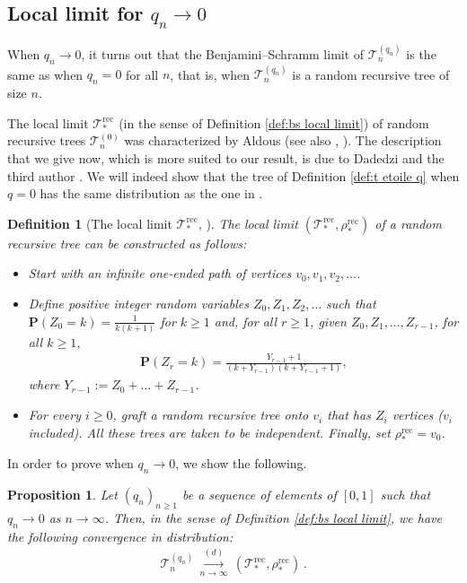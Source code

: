 \documentclass{article}
\newtheorem{proposition}[theorem]{Proposition}
\newtheorem{definition}[theorem]{Definition}
\theoremstyle{remark}
\newcommand{\cv}[1]{\,\underset{#1}{\longrightarrow}\,}
\newcommand{\cT}{\mathcal{T}}
\newcommand{\prob}[1]{\mathbf{P}{\left(#1\right)}}
\newcommand{\rec}{\mathrm{rec}}
\begin{document}
\subsection{Local limit for $q_n \rightarrow 0$}

When $q_n \rightarrow 0$, it turns out that the Benjamini--Schramm limit of $\cT_n^{(q_n)}$ is the same as when $q_n=0$ for all $n$, that is, when $\cT_n^{(q_n)}$ is a random recursive tree of size $n$.

The local limit $\cT_*^\rec$ (in the sense of Definition \ref{def:bs local limit}) of random recursive trees $\cT_n^{(0)}$ was characterized by Aldous \cite[Section 4]{Aldous_1991} (see also \cite{Holmgren_Janson_2017}, \cite[Section 2.2]{Contat_Laulin_2025}). 
The description that we give now, which is more suited to our result, is due to Dadedzi and the third author \cite[Appendix A]{Dadedzi_Wagner_2024}. We will indeed show that the tree of Definition \ref{def:t etoile q} when $q=0$ has the same distribution as the one in \cite{Dadedzi_Wagner_2024}.

\begin{definition}[The local limit $\cT_*^\rec$, \cite{Dadedzi_Wagner_2024}]
\label{def:local limit dadedzi wagner}
The local limit $(\cT_*^\rec, \rho_*^\rec)$ of a random recursive tree can be constructed as follows:
\begin{itemize}
    \item Start with an infinite one-ended path of vertices $v_0,v_1,v_2,\ldots$.
    \item Define positive integer random variables $Z_0,Z_1,Z_2,\ldots$ such that $\prob{Z_0=k}=\frac{1}{k(k+1)}$ for $k \geq 1$ and, for all $r \geq 1$, given $Z_0,Z_1,\ldots,Z_{r-1}$, for all $k \geq 1$,
    \begin{align*}
        \prob{Z_r=k} =\frac{Y_{r-1}+1}{(k+Y_{r-1})(k+Y_{r-1}+1)},
    \end{align*}
    where $Y_{r-1} := Z_0+\ldots+Z_{r-1}$.
    \item For every $i \geq 0$, graft a random recursive tree onto $v_i$ that has $Z_i$ vertices ($v_i$ included). All these trees are taken to be independent.
    Finally, set $\rho_*^\rec = v_0$.
\end{itemize}
\end{definition}

In order to prove  when $q_n\to0$, we show the following.

\begin{proposition}
\label{prop:local limit when q_n goes to 0}
Let $(q_n)_{n \geq 1}$ be a sequence of elements of $[0,1]$ such that $q_n \rightarrow 0$ as $n \rightarrow \infty$. 
Then, in the sense of Definition \ref{def:bs local limit}, we have the following convergence in distribution:
\begin{align*}
    \cT_n^{(q_n)} \overset{(d)}{\cv{n\to\infty}} (\cT_*^\rec , \rho_*^\rec) \,.
\end{align*}
\end{proposition}
\end{document}
